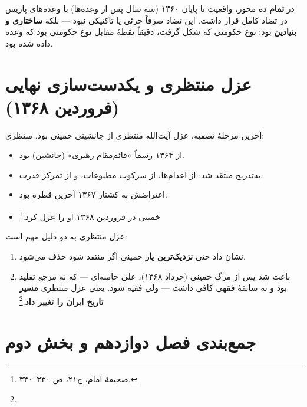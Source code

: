 \documentclass[12pt,a4paper]{book}
\newcommand{\keyword}[1]{\textbf{\textcolor{cPrimary}{#1}}}
\newcommand{\en}[1]{\lr{\textit{#1}}}
\begin{document}
\begin{warningBox}
در \keyword{تمام} ده محور، واقعیت تا پایان ۱۳۶۰ (سه سال پس از وعده‌ها) با وعده‌های پاریس در تضاد کامل قرار داشت. این تضاد صرفاً جزئی یا تاکتیکی نبود — بلکه \keyword{ساختاری و بنیادین} بود: نوع حکومتی که شکل گرفت، دقیقاً نقطهٔ مقابل نوع حکومتی بود که وعده داده شده بود.
\end{warningBox}

\section{عزل منتظری و یکدست‌سازی نهایی (فروردین ۱۳۶۸)}

آخرین مرحلهٔ تصفیه، عزل آیت‌الله منتظری از جانشینی خمینی بود. منتظری:

\begin{itemize}[label=\textcolor{cPrimary}{$\blacktriangleright$}, rightmargin=2em]
    \item از ۱۳۶۴ رسماً «قائم‌مقام رهبری» (جانشین) بود.
    \item به‌تدریج منتقد شد: از اعدام‌ها، از سرکوب مطبوعات، و از تمرکز قدرت.
    \item اعتراضش به کشتار ۱۳۶۷ آخرین قطره بود.
    \item خمینی در فروردین ۱۳۶۸ او را عزل کرد.\footnote{صحیفهٔ امام، ج۲۱، ص ۳۳۰–۳۴۰.}
\end{itemize}

\begin{noteBox}
عزل منتظری به دو دلیل مهم است:
\begin{enumerate}[label=\textcolor{cGold}{\bfseries\arabic*.}, rightmargin=2em]
    \item نشان داد حتی \keyword{نزدیک‌ترین یار} خمینی اگر منتقد شود حذف می‌شود.
    \item باعث شد پس از مرگ خمینی (خرداد ۱۳۶۸)، علی خامنه‌ای — که نه مرجع تقلید بود و نه سابقهٔ فقهی کافی داشت — ولی فقیه شود. یعنی عزل منتظری \keyword{مسیر تاریخ ایران را تغییر داد}.\footnote{\en{Moin (1999), pp.\,280--295.}}
\end{enumerate}
\end{noteBox}

\section{جمع‌بندی فصل دوازدهم و بخش دوم}
\end{document}
